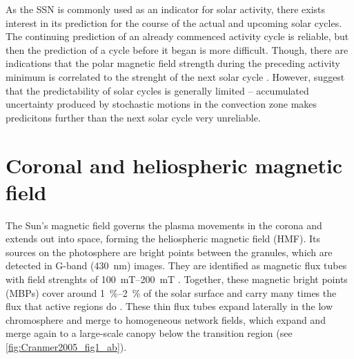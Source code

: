 As the SSN is commonly used as an indicator for solar activity, there exists interest in its prediction for the course of the actual and upcoming solar cycles. The continuing prediction of an already commenced activity cycle is reliable, but then the prediction of a cycle before it began is more difficult. Though, there are indications that the polar magnetic field strength during the preceding activity minimum is correlated to the strenght of the next solar cycle \citep{Schatten1987}. However, \citet{Hathaway2016} suggest that the predictability of solar cycles is generally limited -- accumulated uncertainty produced by stochastic motions in the convection zone makes predicitons further than the next solar cycle very unreliable.


\section{Coronal and heliospheric magnetic field}
\label{sec:coronal_and_heliospheric_magnetic_field}
The Sun's magnetic field governs the plasma movements in the corona and extends out into space, forming the heliospheric magnetic field (HMF). Its sources on the photosphere are bright points between the granules, which are detected in G-band (\SI{430}{\nano\meter}) images. They are identified as magnetic flux tubes with field strenghts of \SIrange{100}{200}{\milli\tesla} \citep{Cranmer2005}. Together, these magnetic bright points (MBPs) cover around \SIrange{1}{2}{\%} of the solar surface and carry many times the flux that active regions do \citep{Sanchez_Almeida2010}. These thin flux tubes expand laterally in the low chromosphere and merge to homogeneous network fields, which expand and merge again to a large-scale canopy below the transition region (see \autoref{fig:Cranmer2005_fig1_ab}).
